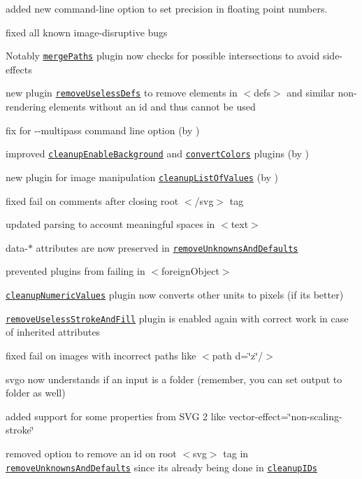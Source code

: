 \begin{DoxyItemize}
\item added new command-\/line option to set precision in floating point numbers.
\item fixed all known image-\/disruptive bugs
\item Notably \href{https://github.com/svg/svgo/blob/master/plugins/mergePaths.js}{\tt merge\+Paths} plugin now checks for possible intersections to avoid side-\/effects
\item new plugin \href{https://github.com/svg/svgo/blob/master/plugins/removeUselessDefs.js}{\tt remove\+Useless\+Defs} to remove elements in {\ttfamily $<$defs$>$} and similar non-\/rendering elements without an {\ttfamily id} and thus cannot be used
\item fix for {\ttfamily -\/-\/multipass} command line option (by )
\item improved \href{https://github.com/svg/svgo/blob/master/plugins/cleanupEnableBackground.js}{\tt cleanup\+Enable\+Background} and \href{https://github.com/svg/svgo/blob/master/plugins/convertColors.js}{\tt convert\+Colors} plugins (by )
\item new plugin for image manipulation \href{https://github.com/svg/svgo/blob/master/plugins/cleanupListOfValues.js}{\tt cleanup\+List\+Of\+Values} (by )
\item fixed fail on comments after closing root {\ttfamily $<$/svg$>$} tag
\item updated parsing to account meaningful spaces in {\ttfamily $<$text$>$}
\item {\ttfamily data-\/$\ast$} attributes are now preserved in \href{https://github.com/svg/svgo/blob/master/plugins/removeUnknownsAndDefaults.js}{\tt remove\+Unknowns\+And\+Defaults}
\item prevented plugins from failing in {\ttfamily $<$foreign\+Object$>$}
\item \href{https://github.com/svg/svgo/blob/master/plugins/cleanupNumericValues.js}{\tt cleanup\+Numeric\+Values} plugin now converts other units to pixels (if it\textquotesingle{}s better)
\item \href{https://github.com/svg/svgo/blob/master/plugins/removeUselessStrokeAndFill.js}{\tt remove\+Useless\+Stroke\+And\+Fill} plugin is enabled again with correct work in case of inherited attributes
\item fixed fail on images with incorrect paths like {\ttfamily $<$path d=\char`\"{}z\char`\"{}/$>$}
\item svgo now understands if an input is a folder (remember, you can set output to folder as well)
\item added support for some properties from S\+VG 2 like {\ttfamily vector-\/effect=\char`\"{}non-\/scaling-\/stroke\char`\"{}}
\item removed option to remove an {\ttfamily id} on root {\ttfamily $<$svg$>$} tag in \href{https://github.com/svg/svgo/blob/master/plugins/removeUnknownsAndDefaults.js}{\tt remove\+Unknowns\+And\+Defaults} since it\textquotesingle{}s already being done in \href{https://github.com/svg/svgo/blob/master/plugins/cleanupIDs.js}{\tt cleanup\+I\+Ds}
\end{DoxyItemize}

